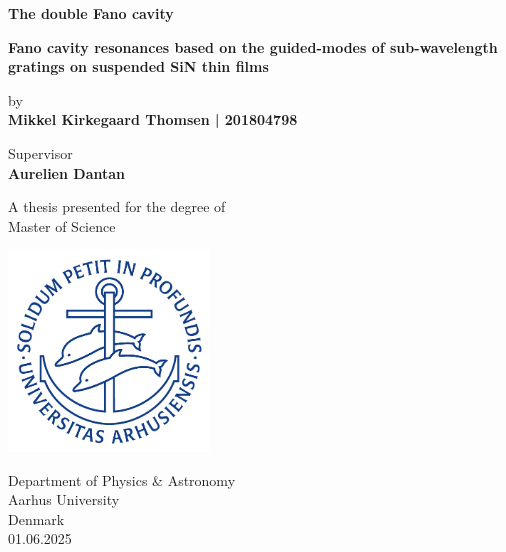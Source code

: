 \begin{titlepage}
    \begin{center}
 
        \Huge{\textbf{The double Fano cavity}}
 
        \large
        \vspace{0.5cm}
        \textbf{Fano cavity resonances based on the guided-modes of sub-wavelength gratings on suspended SiN thin films}
 
        \vspace{0.5cm}
        \large
        by\\
        \vspace{0.5cm}
        \textbf{Mikkel Kirkegaard Thomsen | 201804798}
 
        \vspace{0.5cm}
        Supervisor\\
        \textbf{Aurelien Dantan}
 
        \vfill
 
        \large     
        A thesis presented for the degree of\\
        Master of Science
             
        \vspace{0.5cm}
      
        \includegraphics[width=0.4\textwidth]{figures/au_logo.png}
        
        \large     
        Department of Physics \& Astronomy\\
        Aarhus University\\
        Denmark\\
        01.06.2025\\
    \end{center}
 \end{titlepage}